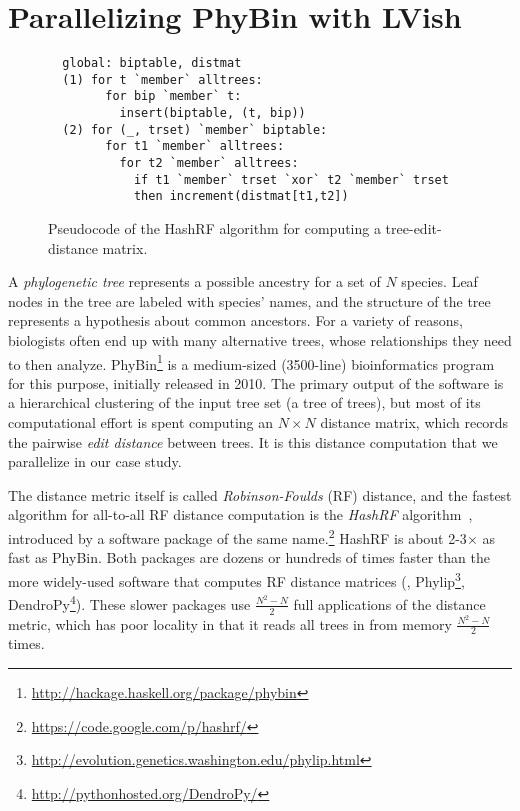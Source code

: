 \section{Parallelizing PhyBin with LVish}\label{s:lvish-phybin}

\begin{figure}
  \centering
\begin{lstlisting}
  global: biptable, distmat
  (1) for t `member` alltrees:
        for bip `member` t:
          insert(biptable, (t, bip))
  (2) for (_, trset) `member` biptable: 
        for t1 `member` alltrees:
          for t2 `member` alltrees:
            if t1 `member` trset `xor` t2 `member` trset
            then increment(distmat[t1,t2])
\end{lstlisting}  
  \caption{Pseudocode of the HashRF algorithm for computing a tree-edit-distance matrix.}
  \label{f:hashrf-alg}
\end{figure}


A {\em phylogenetic tree} represents a possible ancestry for a set of $N$ species.
Leaf nodes in the tree are labeled with species' names, and the structure of the
tree represents a hypothesis about common ancestors. For a variety of reasons, biologists often end up
with many alternative trees, whose relationships they need to then analyze.
PhyBin\footnote{\url{http://hackage.haskell.org/package/phybin}} is a medium-sized (3500-line)
bioinformatics program for this purpose, initially released in 2010.
%
The primary output of the 
software is a hierarchical clustering of the input tree set (a tree
of trees), but most of its computational effort is spent computing an
$N{\times}N$ 
distance matrix, which records the pairwise 
{\em edit distance} between trees.
It is this distance computation that we parallelize in our case study.

The distance metric itself is called {\em Robinson-Foulds} (RF) distance, and
the fastest algorithm for all-to-all RF distance computation is the {\em HashRF}
algorithm~\cite{hashrf}, introduced by a software package of the same name.\footnote{\url{https://code.google.com/p/hashrf/}}  HashRF is about
2-3$\times$ as fast as PhyBin.  Both packages are dozens or hundreds of times faster
than the more widely-used software that computes RF distance matrices (\eg{}, Phylip\footnote{\url{http://evolution.genetics.washington.edu/phylip.html}}, DendroPy\footnote{\url{http://pythonhosted.org/DendroPy/}}).  These
slower packages use $\frac{N^2-N}{2}$ full applications of the distance metric, which has poor
locality in that it reads all trees in from memory $\frac{N^2-N}{2}$ times.
%

